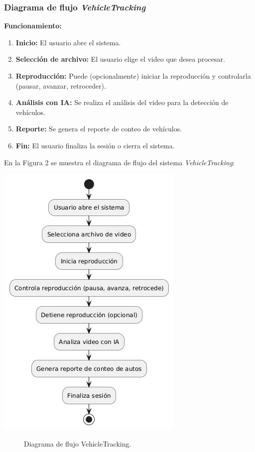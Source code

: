 \documentclass[protocolo.tex]{subfiles}
\begin{document}
\subsubsection{Diagrama de flujo \textit{VehicleTracking}} 
\textbf{Funcionamiento:}
\begin{enumerate}
    \item \textbf{Inicio:}  
    El usuario abre el sistema.
    \item \textbf{Selección de archivo:}  
    El usuario elige el video que desea procesar.
    \item \textbf{Reproducción:}  
    Puede (opcionalmente) iniciar la reproducción y controlarla (pausar, avanzar, retroceder).
    \item \textbf{Análisis con IA:}
    Se realiza el análisis del video para la detección de vehículos.
    \item \textbf{Reporte:}
    Se genera el reporte de conteo de vehículos.
    \item \textbf{Fin:}      
    El usuario finaliza la sesión o cierra el sistema.
\end{enumerate}

En la Figura 2 se muestra el diagrama de flujo del sistema \textit{VehicleTracking}:\vspace{4mm}

\begin{center}
\includegraphics[scale=0.6]{Imagenes/pdf/VehicleTkF.png}
\end{center}
\begin{figure}[h]  %
    \centering
    \caption{Diagrama de flujo VehicleTracking.}
    \label{fig:mi-figura2}
\end{figure}
\end{document}
